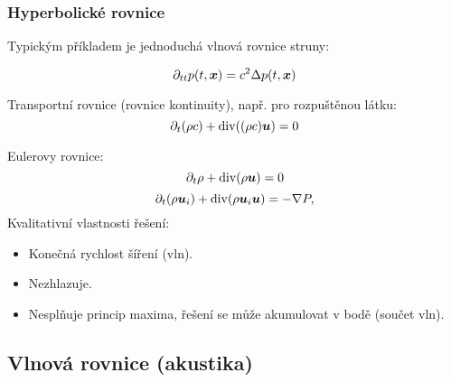 \subsubsection{Hyperbolické rovnice}
Typickým příkladem je jednoduchá vlnová rovnice struny:

\[
    \partial_{tt} p(t, \mathbf{\boldsymbol{x}}) = c^2 \Delta p(t, \mathbf{\boldsymbol{x}})
\]

Transportní rovnice (rovnice kontinuity), např. pro rozpuštěnou látku:
\[
    \partial_t (\rho c) + \operatorname{div}( (\rho c) \mathbf{\boldsymbol{u}})=0
\]

Eulerovy rovnice:
\[
    \partial_t \rho + \operatorname{div}( \rho \mathbf{\boldsymbol{u}})=0
\]
\[
    \partial_t (\rho \mathbf{\boldsymbol{u}}_i) +\operatorname{div}(\rho \mathbf{\boldsymbol{u}}_i \mathbf{\boldsymbol{u}}) = - \nabla P,
\]
Kvalitativní vlastnosti řešení:
\begin{itemize}
 \item Konečná rychlost šíření (vln).
 \item Nezhlazuje.  
 \item Nesplňuje princip maxima, řešení se může akumulovat v bodě 
 (součet vln).
\end{itemize}


\subsection{Vlnová rovnice (akustika)}

